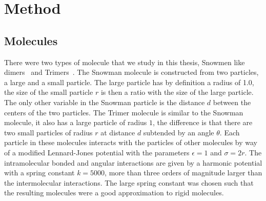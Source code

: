 
\chapter{Method}

\section{Molecules}

There were two types of molecule that we study in this thesis, Snowmen like dimers~ and Trimers~. The Snowman molecule is constructed from two particles, a large and a small particle. The large particle has by definition a radius of \num{1.0}, the size of the small particle $r$ is then a ratio with the size of the large particle. The only other variable in the Snowman particle is the distance $d$ between the centers of the two particles. The Trimer molecule is similar to the Snowman molecule, it also has a large particle of radius $1$, the difference is that there are two small particles of radius $r$ at distance $d$ subtended by an angle $\theta$. Each particle in these molecules interacts with the particles of other molecules by way of a modified Lennard-Jones potential with the parameters $\epsilon = 1$ and $\sigma = 2r$. The intramolecular bonded and angular interactions are given by a harmonic potential with a spring constant $k=5000$, more than three orders of magnitude larger than the intermolecular interactions. The large spring constant was chosen such that the resulting molecules were a good approximation to rigid molecules.


